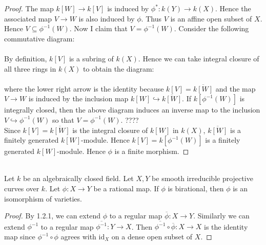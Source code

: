 \documentclass[a4paper]{article}
\begin{document}
\begin{prp}{}{}
\begin{proof}
The map $k[W]\to k[V]$ is induced by $\phi^\ast:k(Y)\to k(X)$. Hence the associated map $V\to W$ is also induced by $\phi$. Thus $V$ is an affine open subset of $X$. Hence $V\subseteq\phi^{-1}(W)$. Now I claim that $V=\phi^{-1}(W)$. Consider the following commutative diagram: \\
\\
By definition, $k[V]$ is a subring of $k(X)$. Hence we can take integral closure of all three rings in $k(X)$ to obtain the diagram: \\
\\
where the lower right arrow is the identity because $k[V]=\overline{k[W]}$ and the map $V\to W$ is induced by the inclusion map $k[W]\hookrightarrow\overline{k[W]}$. If $k[\phi^{-1}(W)]$ is integrally closed, then the above diagram induces an inverse map to the inclusion $V\hookrightarrow\phi^{-1}(W)$ so that $V=\phi^{-1}(W)$. ????\\

Since $k[V]=\overline{k[W]}$ is the integral closure of $k[W]$ in $k(X)$, $\overline{k[W]}$ is a finitely generated $k[W]$-module. Hence $k[V]=k[\phi^{-1}(W)]$ is a finitely generated $k[W]$-module. Hence $\phi$ is a finite morphism. 


\end{proof}
\end{prp}

\begin{prp}{}{}\\
Let $k$ be an algebraically closed field. Let $X,Y$ be smooth irreducible projective curves over $k$. Let $\phi:X\to Y$ be a rational map. If $\phi$ is birational, then $\phi$ is an isomorphism of varieties. 
\begin{proof}
By 1.2.1, we can extend $\phi$ to a regular map $\overline{\phi}:X\to Y$. Similarly we can extend $\phi^{-1}$ to a regular map $\overline{\phi^{-1}}:Y\to X$. Then $\overline{\phi^{-1}}\circ\overline{\phi}:X\to X$ is the identity map since $\phi^{-1}\circ\phi$ agrees with $\text{id}_X$ on a dense open subset of $X$. 
\end{proof}
\end{prp}
\end{document}
